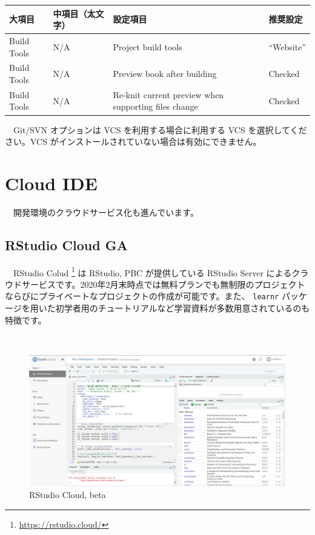 \documentclass[
  12pt,
]{book}
\DeclareRobustCommand{\href}[2]{#2\footnote{\url{#1}}}
\begin{document}
\begin{longtable}[]{@{}
  >{\raggedright\arraybackslash}p{}
  >{\raggedright\arraybackslash}p{}
  >{\raggedright\arraybackslash}p{}
  >{\raggedright\arraybackslash}p{}@{}}
\toprule
大項目 & 中項目（太文字） & 設定項目 & 推奨設定 \\
\midrule
\endhead
Build Tools & N/A & Project build tools & ``Website'' \\
Build Tools & N/A & Preview book after building & Checked \\
Build Tools & N/A & Re-knit current preview when supporting files change & Checked \\
\bottomrule
\end{longtable}

　Git/SVN オプションは VCS を利用する場合に利用する VCS を選択してください。VCS がインストールされていない場合は有効にできません。

\hypertarget{cloud-ide}{%
\chapter{Cloud IDE}\label{cloud-ide}}

　開発環境のクラウドサービス化も進んでいます。

\hypertarget{rstudio-cloud-ga}{%
\section{RStudio Cloud GA}\label{rstudio-cloud-ga}}

　\href{https://rstudio.cloud/}{RStudio Colud } は RStudio, PBC が提供している RStudio Server によるクラウドサービスです。2020年2月末時点では無料プランでも無制限のプロジェクトならびにプライベートなプロジェクトの作成が可能です。また、 \texttt{learnr} パッケージを用いた初学者用のチュートリアルなど学習資料が多数用意されているのも特徴です。

　\\

\begin{figure}[H]

{\centering \includegraphics[width=0.8\linewidth,]{fig/RStudio/Cloud} 

}

\caption{RStudio Cloud, beta}\label{fig:unnamed-chunk-88}
\end{figure}
\end{document}

